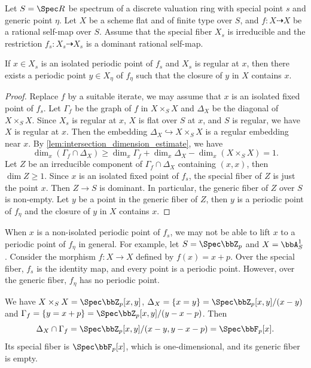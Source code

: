 \begin{lemma}\label{lem:lifting_isolated_periodic_points}
	Let $S = \Spec R$ be spectrum of a discrete valuation ring with special point $s$ and generic point $\eta$.
	Let $X$ be a scheme flat and of finite type over $S$, and $f: X \dashrightarrow X$ be a rational self-map over $S$.
	Assume that the special fiber $X_s$ is irreducible and the restriction $f_s: X_s \dashrightarrow X_s$ is a dominant rational self-map.

	If $x\in X_s$ is an isolated periodic point of $f_s$ and $X_s$ is regular at $x$, then there exists a periodic point $y\in X_\eta$ of $f_\eta$ such that the closure of $y$ in $X$ contains $x$.
\end{lemma}
\begin{proof}
	Replace $f$ by a suitable iterate, we may assume that $x$ is an isolated fixed point of $f_s$.
	Let $\Gamma_f$ be the graph of $f$ in $X \times_S X$ and $\Delta_X$ be the diagonal of $X \times_S X$.
	Since $X_s$ is regular at $x$, $X$ is flat over $S$ at $x$, and $S$ is regular, we have $X$ is regular at $x$.
	Then the embedding $\Delta_X \hookrightarrow X \times_S X$ is a regular embedding near $x$.
	By \cref{lem:intersection_dimension_estimate}, we have
	\[ \dim_x (\Gamma_f \cap \Delta_X) \geq \dim_x \Gamma_f + \dim_x \Delta_X - \dim_x (X \times_S X) = 1. \]
	Let $Z$ be an irreducible component of $\Gamma_f \cap \Delta_X$ containing $(x,x)$, then $\dim Z \geq 1$.
	Since $x$ is an isolated fixed point of $f_s$, the special fiber of $Z$ is just the point $x$.
	Then $Z \to S$ is dominant.
	In particular, the generic fiber of $Z$ over $S$ is non-empty.
	Let $y$ be a point in the generic fiber of $Z$, then $y$ is a periodic point of $f_\eta$ and the closure of $y$ in $X$ contains $x$.
\end{proof}

\begin{example}
	When $x$ is a non-isolated periodic point of $f_s$, we may not be able to lift $x$ to a periodic point of $f_\eta$ in general.
	For example, let $S = \Spec \bbZ_p$ and $X = \bbA^1_S$.
	Consider the morphism $f: X \to X$ defined by $f(x) = x + p$.
	Over the special fiber, $f_s$ is the identity map, and every point is a periodic point.
	However, over the generic fiber, $f_\eta$ has no periodic point.

	We have $X \times_S X = \Spec \bbZ_p[x,y]$, $\Delta_X = \{x=y\} = \Spec \bbZ_p[x,y]/(x-y)$ and $\Gamma_f = \{y = x + p\} = \Spec \bbZ_p[x,y]/(y-x-p)$.
	Then
	\[ \Delta_X \cap \Gamma_f = \Spec \bbZ_p[x,y]/(x-y, y-x-p) = \Spec \bbF_p[x].\]
	Its special fiber is $\Spec \bbF_p[x]$, which is one-dimensional, and its generic fiber is empty.
\end{example}


